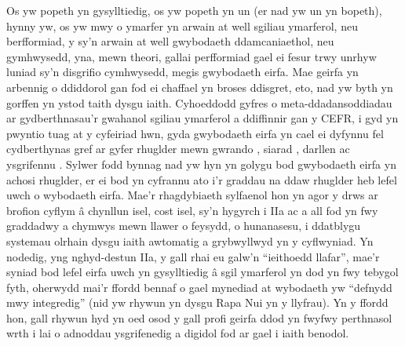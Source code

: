 Os yw popeth yn gysylltiedig, os yw popeth yn un (er nad yw un yn bopeth), hynny yw, os yw mwy o ymarfer yn arwain at well sgiliau ymarferol, neu berfformiad, y sy'n arwain at well gwybodaeth ddamcaniaethol, neu gymhwysedd, yna, mewn theori, gallai perfformiad gael ei fesur trwy unrhyw luniad sy'n disgrifio cymhwysedd, megis gwybodaeth eirfa. Mae geirfa yn arbennig o ddiddorol gan fod ei chaffael yn broses ddisgret, eto, nad yw byth yn gorffen yn ystod taith dysgu iaith. Cyhoeddodd \textcite{eun_hee_jeon_understanding_2022} gyfres o meta-ddadansoddiadau ar gydberthnasau'r gwahanol sgiliau ymarferol a ddiffinnir gan y CEFR, i gyd yn pwyntio tuag at y cyfeiriad hwn, gyda gwybodaeth eirfa yn cael ei dyfynnu fel cydberthynas gref ar gyfer rhuglder mewn gwrando \parencite{innami_meta-analysis_2022}, siarad \parencite{jeon_meta-analysis_2022}, darllen \parencite{jeon_updated_2022} ac ysgrifennu \parencite{kojima_meta-analysis_2022}. Sylwer fodd bynnag nad yw hyn yn golygu bod gwybodaeth eirfa yn achosi rhuglder, er ei bod yn cyfrannu ato i'r graddau na ddaw rhuglder heb lefel uwch o wybodaeth eirfa. Mae'r rhagdybiaeth sylfaenol hon yn agor y drws ar brofion cyflym â chynllun isel, cost isel, sy'n hygyrch i IIa ac a all fod yn fwy graddadwy a chymwys mewn llawer o feysydd, o hunanasesu, i ddatblygu systemau olrhain dysgu iaith awtomatig a grybwyllwyd yn y cyflwyniad. Yn nodedig, yng nghyd-destun IIa, y gall rhai eu galw'n ``ieithoedd llafar'', mae'r syniad bod lefel eirfa uwch yn gysylltiedig â sgil ymarferol yn dod yn fwy tebygol fyth, oherwydd mai'r ffordd bennaf o gael mynediad at wybodaeth yw ``defnydd mwy integredig'' (nid yw rhywun yn dysgu Rapa Nui yn y llyfrau). Yn y ffordd hon, gall rhywun hyd yn oed osod y gall profi geirfa ddod yn fwyfwy perthnasol wrth i lai o adnoddau ysgrifenedig a digidol fod ar gael i iaith benodol.

